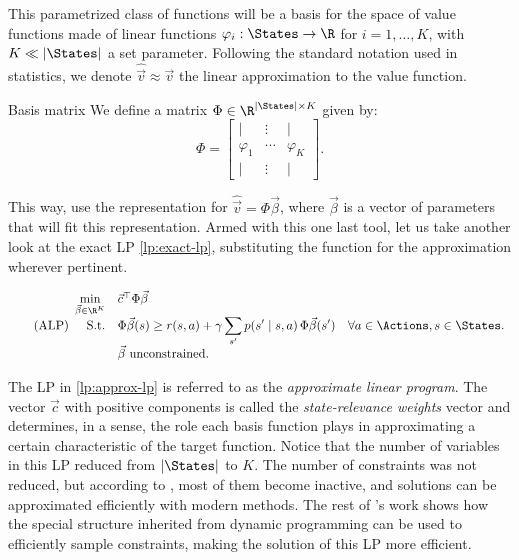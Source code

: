 This parametrized class of functions will be a basis for the space of value
functions made of linear functions $\varphi_i : \States \to \R$ for $i = 1,
\dots, K$, with $K \ll |\States|$ a set parameter. Following the standard
notation used in statistics, we denote $\widehat{\vec{v}} \approx \vec{v}$ the
linear approximation to the value function.

\begin{dfn}{Basis matrix}{}
    We define a matrix $\Phi \in \R^{|\States| \times K}$ given by:
    \begin{equation*}
        \Phi =
        \begin{bmatrix}
            | & \vdots & | \\
            \varphi_1 & \cdots & \varphi_K \\
            | & \vdots & |
        \end{bmatrix}.
    \end{equation*}
\end{dfn}

This way, use the representation for $\widehat{\vec{v}} = \Phi \vec{\beta}$,
where $\vec{\beta}$ is a vector of parameters that will fit this representation.
Armed with this one last tool, let us take another look at the exact LP
\eqref{lp:exact-lp}, substituting the function for the approximation wherever
pertinent.

\begin{equation}
\label{lp:approx-lp}
\tag{ALP}
\begin{array}{rl@{}ll}
    \displaystyle \min_{\vec{\beta} \in \R^{K}} & \vec{c}^{\top} \Phi \vec{\beta} \\
    \text{S.t.} & \displaystyle \Phi \vec{\beta}(s) \geq r(s,a) + \gamma \sum_{s'} p(s' \mid s, a) \, \Phi \vec{\beta} (s') & \quad \forall a \in \Actions, s \in \States. \\
    & \vec{\beta} \text{ unconstrained}.
\end{array}
\end{equation}

The LP in \eqref{lp:approx-lp} is referred to as the \textit{approximate linear
program}. The vector $\vec{c}$ with positive components is called the
\emph{state-relevance weights} vector and determines, in a sense, the role each
basis function plays in approximating a certain characteristic of the target
function. Notice that the number of variables in this LP reduced from
$|\States|$ to $K$. The number of constraints was not reduced, but according to
\cite{farias2002thesis}, most of them become inactive, and solutions can be
approximated efficiently with modern methods. The rest of
\citeauthor{farias2002thesis}'s work shows how the special structure inherited
from dynamic programming can be used to efficiently sample constraints, making
the solution of this LP more efficient.

